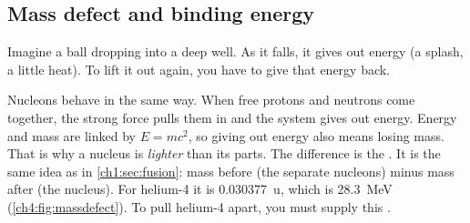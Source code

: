\begin{keywords}
\end{keywords}

\subsection{Mass defect and binding energy}

Imagine a ball dropping into a deep well. As it falls, it gives out energy (a
splash, a little heat). To lift it out again, you have to give that energy back.

Nucleons behave in the same way. When free protons and neutrons come together, the
strong force pulls them in and the system gives out energy. Energy and mass are
linked by $E = mc^2$, so giving out energy also means losing mass. That is why a
nucleus is \emph{lighter} than its parts. The difference is the .
It is the same idea as in \cref{ch1:sec:fusion}: mass before (the separate nucleons)
minus mass after (the nucleus). For helium-4 it is \qty{0.030377}{\amu}, which is \qty{28.3}{MeV}
(\cref{ch4:fig:massdefect}). To pull helium-4 apart, you must supply this
.

